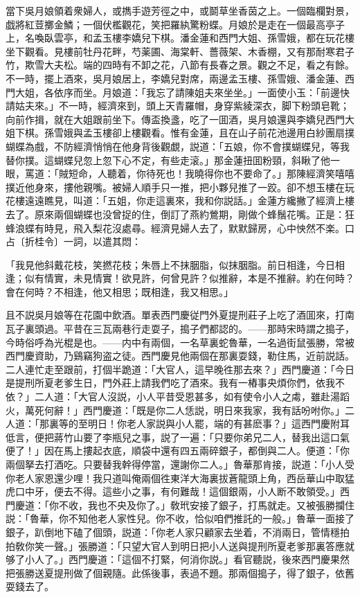當下吳月娘領着衆婦人，或擕手遊芳徑之中，或鬬草坐香茵之上。一個臨欄對景，戯將紅荳擲金鱗；一個伏檻觀花，笑把羅紈驚粉蝶。月娘於是走在一個最高亭子上，名喚臥雲亭，和孟玉樓李嬌兒下棋。潘金蓮和西門大姐、孫雪娥，都在玩花樓坐下觀看。見樓前牡丹花畔，芍薬圃、海棠軒、薔薇架、木香棚，又有那耐寒君子竹，欺雪大夫松。端的四時有不卸之花，八節有長春之景。觀之不足，看之有餘。不一時，擺上酒來，吳月娘居上，李嬌兒對席，兩邊孟玉樓、孫雪娥、潘金蓮、西門大姐，各依序而坐。月娘道：「我忘了請陳姐夫來坐坐。」一面使小玉：「前邊快請姑夫來。」不一時，經濟來到，頭上天青羅帽，身穿紫綾深衣，脚下粉頭皂靴；向前作揖，就在大姐跟前坐下。傳盃換盞，吃了一囬酒，吳月娘還與李嬌兒西門大姐下棋。孫雪娥與孟玉樓卻上樓觀看。惟有金蓮，且在山子前花池邊用白紗團扇撲蝴蝶為戲，不防經濟悄悄在他身背後觀覷，説道：「五娘，你不會撲蝴蝶兒，等我替你撲。這蝴蝶兒忽上忽下心不定，有些走滚。」那金蓮扭囬粉頸，斜瞅了他一眼，罵道：「賊短命，人聽着，你待死也！我曉得你也不要命了。」那陳經濟笑嘻嘻撲近他身來，摟他親嘴。被婦人順手只一推，把小夥兒推了一跤。卻不想玉樓在玩花樓遠遠瞧見，叫道：「五姐，你走這裏來，我和你説話。」金蓮方纔撇了經濟上樓去了。原來兩個蝴蝶也没曾捉的住，倒訂了燕約鶯期，剛做个蜂鬚花嘴。正是：狂蜂浪蝶有時見，飛入梨花沒處尋。經濟見婦人去了，默默歸房，心中怏然不楽。口占〔折桂令〕一詞，以遣其悶：

\begin{myquote}
「我見他斜戴花枝，笑撚花枝；朱唇上不抹胭脂，似抹胭脂。前日相逢，今日相逢；似有情實，未見情實！欲見許，何曾見許？似推辭，本是不推辭。約在何時？會在何時？不相逢，他又相思；既相逢，我又相思。」
\end{myquote}

且不説吳月娘等在花園中飲酒。單表西門慶従門外夏提刑莊子上吃了酒囬來，打南瓦子裏頭過。平昔在三瓦兩巷行走耍子，搗子們都認的。——那時宋時謂之搗子，今時俗呼為光棍是也。——内中有兩個，一名草裏蛇魯華，一名過街鼠張勝，常被西門慶資助，乃鷄竊狗盗之徒。西門慶見他兩個在那裏耍錢，勒住馬，近前説話。二人連忙走至跟前，打個半跪道：「大官人，這早晚徃那去來？」西門慶道：「今日是提刑所夏老爹生日，門外莊上請我們吃了酒來。我有一樁事央煩你們，依我不依？」二人道：「大官人沒説，小人平昔受恩甚多，如有使令小人之䖏，雖赴湯蹈火，萬死何辭！」西門慶道：「既是你二人恁説，明日來我家，我有話吩咐你。」二人道：「那裏等的至明日！你老人家説與小人罷，端的有甚麽事？」這西門慶附耳低言，便把蔣竹山要了李瓶兒之事，説了一遍：「只要你弟兄二人，替我出這口氣便了！」因在馬上摟起衣底，順袋中還有四五兩碎銀子，都倒與二人。便道：「你兩個拏去打酒吃。只要替我幹得停當，還謝你二人。」魯華那肯接，説道：「小人受你老人家恩還少哩！我只道叫俺兩個徃東洋大海裏拔蒼龍頭上角，西岳華山中取猛虎口中牙，便去不得。這些小之事，有何難哉！這個銀兩，小人断不敢領受。」西門慶道：「你不收，我也不央及你了。」敎玳安接了銀子，打馬就走。又被張勝攔住説：「魯華，你不知他老人家性兒。你不收，恰似咱們推託的一般。」魯華一面接了銀子，趴倒地下磕了個頭，説道：「你老人家只顧家去坐着，不消兩日，管情穩拍拍敎你笑一聲。」張勝道：「只望大官人到明日把小人送與提刑所夏老爹那裏答應就够了小人了。」西門慶道：「這個不打緊，何消你説。」看官聽説，後來西門慶果然把張勝送夏提刑做了個親隨。此係後事，表過不題。那兩個搗子，得了銀子，依舊耍錢去了。

